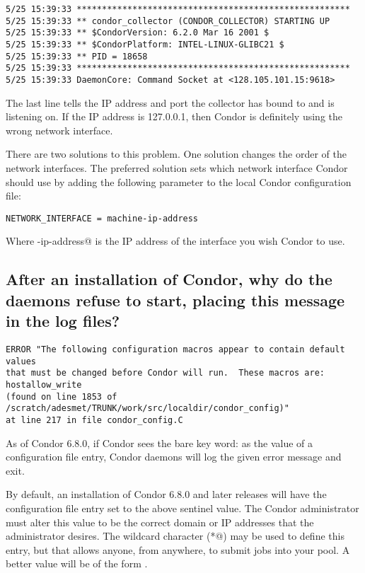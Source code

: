 \footnotesize
\begin{verbatim}
5/25 15:39:33 ******************************************************
5/25 15:39:33 ** condor_collector (CONDOR_COLLECTOR) STARTING UP
5/25 15:39:33 ** $CondorVersion: 6.2.0 Mar 16 2001 $
5/25 15:39:33 ** $CondorPlatform: INTEL-LINUX-GLIBC21 $
5/25 15:39:33 ** PID = 18658
5/25 15:39:33 ******************************************************
5/25 15:39:33 DaemonCore: Command Socket at <128.105.101.15:9618>
\end{verbatim}
\normalsize

The last line tells the IP address and port the collector has
bound to and is listening on.
If the IP address is 127.0.0.1, then Condor is definitely using the wrong
network interface.

There are two solutions to this problem.
One solution changes the order of the network interfaces.
The preferred solution
sets which network interface Condor should use
by adding the following parameter to the
local Condor configuration file:

\begin{verbatim}
NETWORK_INTERFACE = machine-ip-address
\end{verbatim}

Where \verb@machine-ip-address@ is the IP address of the interface you wish
Condor to use.

\subsection*{After an installation of Condor, why do the daemons refuse to 
	start, placing this message in the log files?}

\begin{verbatim}
ERROR "The following configuration macros appear to contain default values 
that must be changed before Condor will run.  These macros are:
hostallow_write 
(found on line 1853 of /scratch/adesmet/TRUNK/work/src/localdir/condor_config)"
at line 217 in file condor_config.C
\end{verbatim}

As of Condor 6.8.0, if 
Condor sees the bare key word: 
as the value of a configuration file entry,
Condor daemons will log the given error message and exit.

By default, an installation of Condor 6.8.0 and later releases
will have the
configuration file entry  set to the above sentinel
value. 
The Condor administrator must alter this value to be the correct domain
or IP addresses that the administrator desires.
The wildcard character (\verb@*@) may be used to define this entry,
but that allows anyone, from anywhere,
to submit jobs into your pool.
A better value will be of the form .

